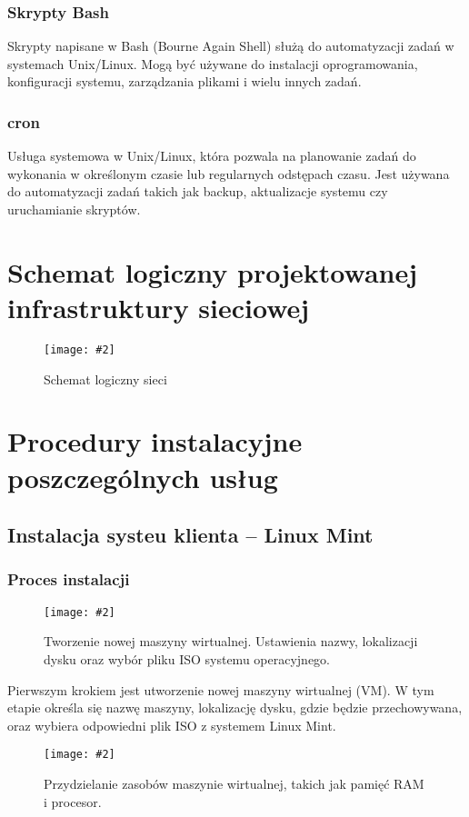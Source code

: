 \documentclass[a4paper]{article}
\newcommand*{\zdj}[2][\textwidth]{\texttt{[image: \#2]}}
\newcommand*{\fg}[4][!htb]{
      \begin{figure*}[#1]
            \zdj{#2}
            \caption[#4]{#3}
      \end{figure*}
}
\begin{document}
\subsubsection{Skrypty Bash}
Skrypty napisane w Bash (Bourne Again Shell) służą do automatyzacji zadań w systemach Unix/Linux. Mogą być używane do instalacji oprogramowania, konfiguracji systemu, zarządzania plikami i wielu innych zadań.

\subsubsection{cron}
Usługa systemowa w Unix/Linux, która pozwala na planowanie zadań do wykonania w określonym czasie lub regularnych odstępach czasu. Jest używana do automatyzacji zadań takich jak backup, aktualizacje systemu czy uruchamianie skryptów.

\section{Schemat logiczny projektowanej infrastruktury sieciowej}
\fg{contents/VirtualBox-network-setup/setup.png}{Schemat logiczny sieci}{Schemat logiczny sieci}
\newpage

\section{Procedury instalacyjne poszczególnych usług}
\subsection{Instalacja systeu klienta – Linux Mint}
\subsubsection{Proces instalacji}

\fg[h]{contents/OS_installation/Linux_mint/1.png}{Tworzenie nowej maszyny wirtualnej. Ustawienia nazwy, lokalizacji dysku oraz wybór pliku ISO systemu operacyjnego.}{Tworzenie nowej maszyny wirtualnej}

Pierwszym krokiem jest utworzenie nowej maszyny wirtualnej (VM). W tym etapie określa się nazwę maszyny, lokalizację dysku, gdzie będzie przechowywana, oraz wybiera odpowiedni plik ISO z systemem Linux Mint.

\fg{contents/OS_installation/Linux_mint/2.png}{Przydzielanie zasobów maszynie wirtualnej, takich jak pamięć RAM i procesor.}{Przydzielanie zasobów maszynie wirtualnej}
\end{document}
